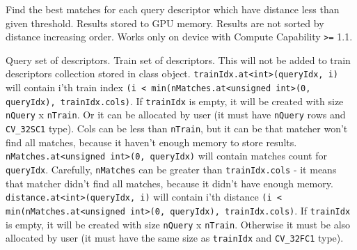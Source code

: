 \label{cppfunc.gpu.BruteForceMatcher.radiusMatchSingle}
Find the best matches for each query descriptor which have distance less than given threshold. Results stored to GPU memory. Results are not sorted by distance increasing order. Works only on device with Compute Capability \texttt{>=} 1.1.
\begin{description}
 {Query set of descriptors.}
 {Train set of descriptors. This will not be added to train descriptors collection stored in class object.}
 {\texttt{trainIdx.at<int>(queryIdx, i)} will contain i'th train index \newline\texttt{(i < min(nMatches.at<unsigned int>(0, queryIdx), trainIdx.cols)}. If \texttt{trainIdx} is empty, it will be created with size \texttt{nQuery} x \texttt{nTrain}. Or it can be allocated by user (it must have \texttt{nQuery} rows and \texttt{CV\_32SC1} type). Cols can be less than \texttt{nTrain}, but it can be that matcher won't find all matches, because it haven't enough memory to store results.}
 {\texttt{nMatches.at<unsigned int>(0, queryIdx)} will contain matches count for \texttt{queryIdx}. Carefully, \texttt{nMatches} can be greater than \texttt{trainIdx.cols} - it means that matcher didn't find all matches, because it didn't have enough memory.}
 {\texttt{distance.at<int>(queryIdx, i)} will contain i'th distance \newline\texttt{(i < min(nMatches.at<unsigned int>(0, queryIdx), trainIdx.cols)}. If \texttt{trainIdx} is empty, it will be created with size \texttt{nQuery} x \texttt{nTrain}. Otherwise it must be also allocated by user (it must have the same size as \texttt{trainIdx} and \texttt{CV\_32FC1} type).}
\end{description}

